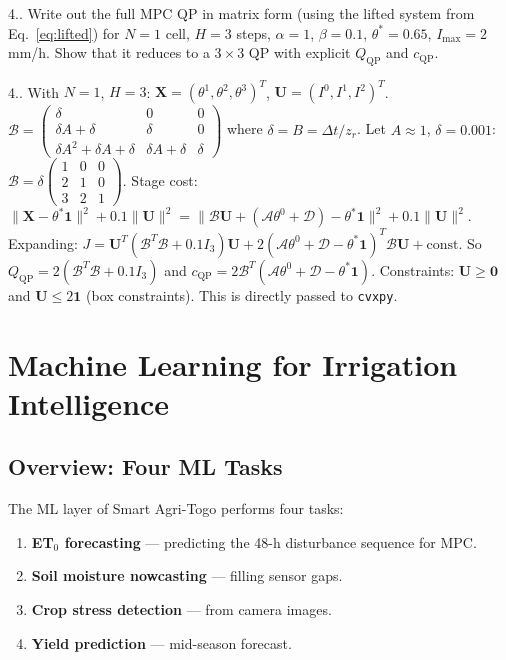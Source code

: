 \documentclass[12pt,a4paper,openany]{book}
\newcounter{exoctr}[chapter]
\renewcommand{\theexoctr}{\thechapter.\arabic{exoctr}}
\begin{document}
\begin{exobox}{4.\theexoctr}
Write out the full MPC QP in matrix form (using the lifted system from Eq.~\eqref{eq:lifted}) for $N=1$ cell, $H=3$ steps, $\alpha=1$, $\beta=0.1$, $\theta^*=0.65$, $I_{\max}=2$ mm/h. Show that it reduces to a $3\times3$ QP with explicit $Q_{\text{QP}}$ and $c_{\text{QP}}$.
\end{exobox}

\begin{solbox}{4.\theexoctr}
With $N=1$, $H=3$: $\mathbf{X}=(\theta^1,\theta^2,\theta^3)^T$, $\mathbf{U}=(I^0,I^1,I^2)^T$.
$\mathcal{B}=\begin{pmatrix}\delta&0&0\\\delta A+\delta&\delta&0\\\delta A^2+\delta A+\delta&\delta A+\delta&\delta\end{pmatrix}$ where $\delta=B=\Delta t/z_r$. Let $A\approx1$, $\delta=0.001$:
$\mathcal{B}=\delta\begin{pmatrix}1&0&0\\2&1&0\\3&2&1\end{pmatrix}$.
Stage cost: $\|\mathbf{X}-\theta^*\bm{1}\|^2+0.1\|\mathbf{U}\|^2=\|\mathcal{B}\mathbf{U}+(\mathcal{A}\theta^0+\mathcal{D})-\theta^*\bm{1}\|^2+0.1\|\mathbf{U}\|^2$.
Expanding: $J=\mathbf{U}^T(\mathcal{B}^T\mathcal{B}+0.1I_3)\mathbf{U}+2(\mathcal{A}\theta^0+\mathcal{D}-\theta^*\bm{1})^T\mathcal{B}\mathbf{U}+\text{const}$.
So $Q_{\text{QP}}=2(\mathcal{B}^T\mathcal{B}+0.1I_3)$ and $c_{\text{QP}}=2\mathcal{B}^T(\mathcal{A}\theta^0+\mathcal{D}-\theta^*\bm{1})$.
Constraints: $\mathbf{U}\geq\bm{0}$ and $\mathbf{U}\leq 2\bm{1}$ (box constraints). This is directly passed to \texttt{cvxpy}.
\end{solbox}

\chapter{Machine Learning for Irrigation Intelligence}
\label{chap:ml}

\section{Overview: Four ML Tasks}

The ML layer of Smart Agri-Togo performs four tasks:
\begin{enumerate}[leftmargin=2em]
  \item \textbf{ET$_0$ forecasting} — predicting the 48-h disturbance sequence for MPC.
  \item \textbf{Soil moisture nowcasting} — filling sensor gaps.
  \item \textbf{Crop stress detection} — from camera images.
  \item \textbf{Yield prediction} — mid-season forecast.
\end{enumerate}
\end{document}
